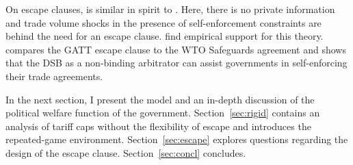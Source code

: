 On escape clauses, \Textcite{bs1990} is similar in spirit to \Textcite{bs2005}. Here, there is no private information and trade volume shocks in the presence of self-enforcement constraints are behind the need for an escape clause. \Textcite{bc} find empirical support for this theory. \Textcite{beshkar2010b} compares the GATT escape clause to the WTO Safeguards agreement and shows that the DSB as a non-binding arbitrator can assist governments in self-enforcing their trade agreements.

In the next section, I present the model and an in-depth discussion of the political welfare function of the government. Section~\ref{sec:rigid} contains an analysis of tariff caps without the flexibility of escape and introduces the repeated-game environment. Section~\ref{sec:escape} explores questions regarding the design of the escape clause. Section~\ref{sec:concl} concludes.